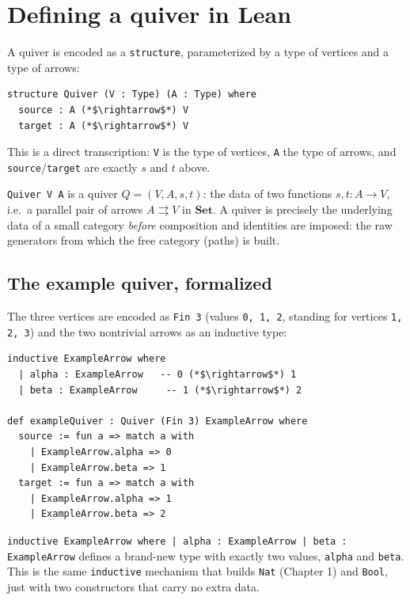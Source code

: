 \section{Defining a quiver in Lean}\label{sec:11-path-algebras:03-defining-a-quiver:1}

A quiver is encoded as a \texttt{structure}, parameterized by a type of vertices and a type of arrows:

\begin{lstlisting}
structure Quiver (V : Type) (A : Type) where
  source : A (*$\rightarrow$*) V
  target : A (*$\rightarrow$*) V
\end{lstlisting}

This is a direct transcription: \texttt{V} is the type of vertices, \texttt{A} the type of arrows, and \texttt{source}/\texttt{target} are exactly \(s\) and \(t\) above.

\begin{mathreading}

\texttt{Quiver V A} is a quiver \(Q = (V, A, s, t)\): the data of two functions \(s, t : A \to V\), i.e.~a parallel pair of arrows \(A \rightrightarrows V\) in \(\mathbf{Set}\). A quiver is precisely the underlying data of a small category \emph{before} composition and identities are imposed: the raw generators from which the free category (paths) is built.

\end{mathreading}

\subsection{The example quiver, formalized}\label{sec:11-path-algebras:03-defining-a-quiver:2}

The three vertices are encoded as \texttt{Fin 3} (values \texttt{0, 1, 2}, standing for vertices \texttt{1, 2, 3}) and the two nontrivial arrows as an inductive type:

\begin{lstlisting}
inductive ExampleArrow where
  | alpha : ExampleArrow   -- 0 (*$\rightarrow$*) 1
  | beta : ExampleArrow     -- 1 (*$\rightarrow$*) 2

def exampleQuiver : Quiver (Fin 3) ExampleArrow where
  source := fun a => match a with
    | ExampleArrow.alpha => 0
    | ExampleArrow.beta => 1
  target := fun a => match a with
    | ExampleArrow.alpha => 1
    | ExampleArrow.beta => 2
\end{lstlisting}

\texttt{inductive ExampleArrow where | alpha : ExampleArrow | beta : ExampleArrow} defines a brand-new type with exactly two values, \texttt{alpha} and \texttt{beta}. This is the same \texttt{inductive} mechanism that builds \texttt{Nat} (Chapter 1) and \texttt{Bool}, just with two constructors that carry no extra data.

